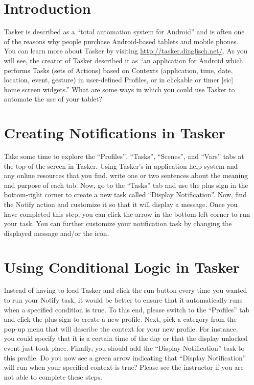 

\usepackage[compact]{titlesec}



\section*{Introduction}

Tasker is described as a ``total automation system for Android'' and is often one of the reasons why people purchase
Android-based tablets and mobile phones.  You can learn more about Tasker by visiting
\url{http://tasker.dinglisch.net/}. As you will see, the creator of Tasker described it as ``an application for Android
which performs Tasks (sets of Actions) based on Contexts (application, time, date, location, event, gesture) in
user-defined Profiles, or in clickable or timer [sic] home screen widgets.''  What are some ways in which you could use
Tasker to automate the use of your tablet?

\section*{Creating Notifications in Tasker}

Take some time to explore the ``Profiles'', ``Tasks'', ``Scenes'', and ``Vars'' tabs at the top of the screen in Tasker.
Using Tasker's in-application help system and any online resources that you find, write one or two sentences about the
meaning and purpose of each tab. Now, go to the ``Tasks'' tab and use the plus sign in the bottom-right corner to create
a new task called ``Display Notification''.  Now, find the Notify action and customize it so that it will display a
message.  Once you have completed this step, you can click the arrow in the bottom-left corner to run your task. You can
further customize your notification task by changing the displayed message and/or the icon. 

\section*{Using Conditional Logic in Tasker}

Instead of having to load Tasker and click the run button every time you wanted to run your Notify task, it would be
better to ensure that it automatically runs when a specified condition is true. To this end, please switch to the
``Profiles'' tab and click the plus sign to create a new profile.  Next, pick a category from the pop-up menu that will
describe the context for your new profile.  For instance, you could specify that it is a certain time of the day or that
the display unlocked event just took place. Finally, you should add the ``Display Notification'' task to this profile.
Do you now see a green arrow indicating that ``Display Notification'' will run when your specified context is true?
Please see the instructor if you are not able to complete these steps.


